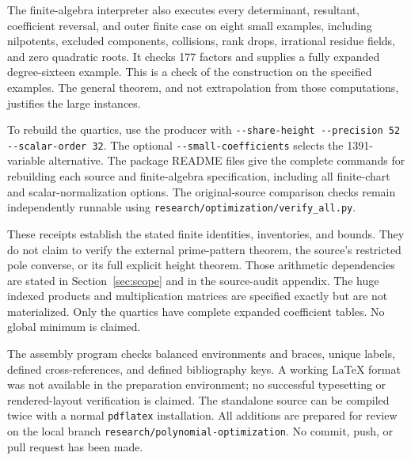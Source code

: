 \documentclass[11pt]{article}
\theoremstyle{definition}
\begin{document}
The finite-algebra interpreter also executes every determinant,
resultant, coefficient reversal, and outer finite case on eight small
examples, including nilpotents, excluded components, collisions,
rank drops, irrational residue fields, and zero quadratic roots. It
checks 177 factors and supplies a fully expanded degree-sixteen
example. This is a check of the construction on the specified examples.
The general theorem, and not extrapolation from those computations,
justifies the large instances.

To rebuild the quartics, use the producer with
\nolinkurl{--share-height --precision 52 --scalar-order 32}.
The optional \nolinkurl{--small-coefficients} selects the
1391-variable alternative. The package README files give the complete
commands for rebuilding each source and finite-algebra specification,
including all finite-chart and scalar-normalization options.
The original-source comparison checks remain independently runnable
using \nolinkurl{research/optimization/verify_all.py}.

These receipts establish the stated finite identities, inventories,
and bounds. They do not claim to verify the external prime-pattern
theorem, the source's restricted pole converse, or its full explicit
height theorem. Those arithmetic dependencies are stated in
Section~\ref{sec:scope} and in the source-audit appendix.
The huge indexed products and multiplication matrices are specified
exactly but are not materialized. Only the quartics have complete
expanded coefficient tables. No global minimum is claimed.

The assembly program checks balanced environments and braces, unique
labels, defined cross-references, and defined bibliography keys. A
working LaTeX format was not available in the preparation environment;
no successful typesetting or rendered-layout verification is claimed.
The standalone source can be compiled twice with a normal
\texttt{pdflatex} installation. All additions are prepared for review
on the local branch \nolinkurl{research/polynomial-optimization}.
No commit, push, or pull request has been made.
\end{document}
